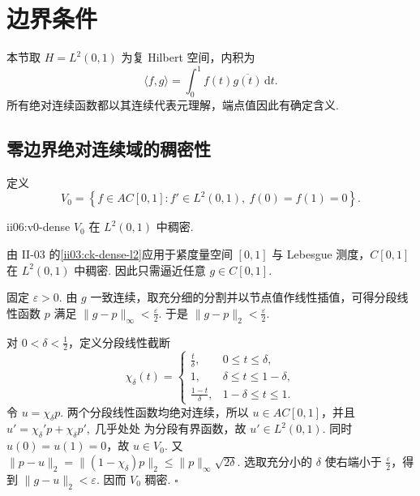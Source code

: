 \section{边界条件}\label{sec:ii06-boundary-conditions}

本节取
\(\displaystyle H=L^2(0,1)\)
为复 Hilbert 空间，内积为
\[
\langle f,g\rangle
=
\int_0^1 f(t)\overline{g(t)}\,\mathrm{d}t.
\]
所有绝对连续函数都以其连续代表元理解，端点值因此有确定含义.

\subsection{零边界绝对连续域的稠密性}

定义
\[
V_0
=
\left\{
 f\in AC[0,1]:f'\in L^2(0,1),\ f(0)=f(1)=0
\right\}.
\]

\begin{FALemma}{ii06:v0-dense}
\(\displaystyle V_0\) 在 \(\displaystyle L^2(0,1)\) 中稠密.
\end{FALemma}

\begin{FAProof}
由 II-03 的\autoref{ii03:ck-dense-l2}应用于紧度量空间 \(\displaystyle[0,1]\) 与 Lebesgue 测度，\(\displaystyle C[0,1]\) 在 \(\displaystyle L^2(0,1)\) 中稠密. 因此只需逼近任意 \(\displaystyle g\in C[0,1]\).

固定 \(\displaystyle\varepsilon>0\). 由 \(\displaystyle g\) 一致连续，取充分细的分割并以节点值作线性插值，可得分段线性函数 \(\displaystyle p\) 满足
\(\displaystyle \|g-p\|_\infty<\frac{\varepsilon}{2}.\)
于是 \(\displaystyle\|g-p\|_2<\frac{\varepsilon}{2}\).

对 \(\displaystyle0<\delta<\frac{1}{2}\)，定义分段线性截断
\[
\chi_\delta(t)
=
\begin{cases}
 \frac{t}{\delta},&0\leqslant t\leqslant\delta,\\
 1,&\delta\leqslant t\leqslant1-\delta,\\
 \frac{1-t}{\delta},&1-\delta\leqslant t\leqslant1.
\end{cases}
\]
令 \(\displaystyle u=\chi_\delta p\). 两个分段线性函数均绝对连续，所以 \(\displaystyle u\in AC[0,1]\)，并且
\(\displaystyle u' = \chi_\delta' p+\chi_\delta p' ,\;\text{几乎处处}\)
为分段有界函数，故 \(\displaystyle u'\in L^2(0,1)\). 同时 \(\displaystyle u(0)=u(1)=0\)，故 \(\displaystyle u\in V_0\). 又
\(\displaystyle \|p-u\|_2 = \|(1-\chi_\delta)p\|_2 \leqslant \|p\|_\infty\sqrt{2\delta}.\)
选取充分小的 \(\displaystyle\delta\) 使右端小于 \(\displaystyle\frac{\varepsilon}{2}\)，得到 \(\displaystyle\|g-u\|_2<\varepsilon\). 因而 \(\displaystyle V_0\) 稠密.
\hfill\(\square\)
\end{FAProof}

